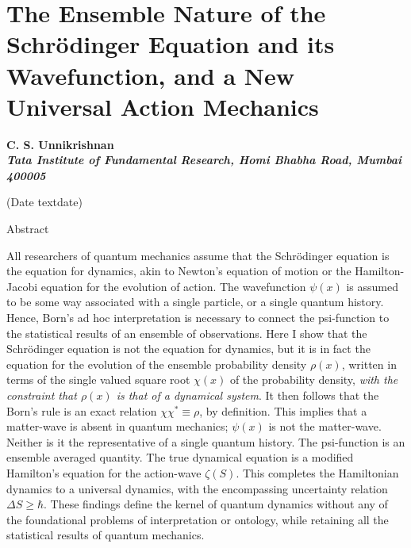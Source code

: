 \chapter[The Ensemble Nature of the Schr\"{o}dinger Equation...]{The Ensemble Nature of the Schr\"{o}dinger Equation and its Wavefunction, and a New Universal Action Mechanics}\label{chap27}


\begin{center}
\textbf{C. S. Unnikrishnan}\\
\textbf{\textit{Tata Institute of Fundamental Research, Homi Bhabha Road, Mumbai 400005}}
\end{center}

\begin{center}
(Date textdate)\\

\medskip

Abstract
\end{center}


All researchers of quantum mechanics assume that the Schr\"{o}dinger equation is the equation for
dynamics, akin to Newton's equation of motion or the Hamilton-Jacobi equation for the evolution
of action. The wavefunction $\psi(x)$ is assumed to be some way associated with a single particle,
or a single quantum history. Hence, Born's ad hoc interpretation is necessary to connect the psi-function to the statistical results of an ensemble of observations. Here I show that the Schr\"{o}dinger
equation is not the equation for dynamics, but it is in fact the equation for the evolution of
the ensemble probability density $\rho(x)$, written in terms of the single valued square root $\chi(x)$
of the probability density, \textit{with the constraint that $\rho(x)$ is that of a dynamical system}. It then
follows that the Born's rule is an exact relation $\chi \chi^{\ast} \equiv \rho$, by definition. This implies that a
matter-wave is absent in quantum mechanics; $\psi(x)$ is not the matter-wave. Neither is it the
representative of a single quantum history. The psi-function is an ensemble averaged quantity.
The true dynamical equation is a modified Hamilton's equation for the action-wave $\zeta(S)$. This
completes the Hamiltonian dynamics to a universal dynamics, with the encompassing uncertainty
relation $\Delta S \geq \hbar$. These findings define the kernel of quantum dynamics without any of the
foundational problems of interpretation or ontology, while retaining all the statistical results of
quantum mechanics.

